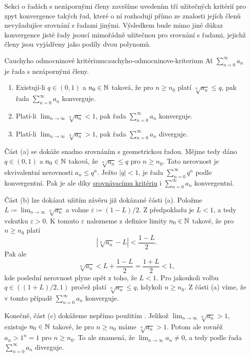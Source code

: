 Sekci o řadách s nezápornými členy završíme uvedením tří užitečných kritérií pro
zpyt konvergence takých řad, které o ní rozhodují přímo ze znalosti jejích
členů nevyžadujíce srovnání s řadami jinými. Výsledkem bude mimo jiné důkaz
konvergence jisté řady jsoucí mimořádně užitečnou pro srovnání s řadami, jejichž
členy jsou vyjádřeny jako podíly dvou polynomů.

\begin{theorem}{Cauchyho odmocninové kritérium}{cauchyho-odmocninove-kriterium}
 Ať $\sum_{n = 0}^{\infty} a_n$ je řada s nezápornými členy.
 \begin{enumerate}[label=(\alph*)]
  \item Existují-li $q \in (0,1)$ a $n_0 \in \mathbb{N}$ taková, že pro $n \geq n_0$
   platí $\sqrt[n]{a_n} \leq q$, pak řada $\sum_{n = 0}^{\infty} a_n$
   konverguje.
  \item Platí-li $\lim_{n \to \infty} \sqrt[n]{a_n} < 1$, pak řada $\sum_{n =
   0}^{\infty} a_n$ konverguje.
  \item Platí-li $\lim_{n \to \infty} \sqrt[n]{a_n} > 1$, pak řada $\sum_{n =
   0}^{\infty} a_n$ diverguje.
 \end{enumerate}
\end{theorem}

\begin{thmproof}
 Část (a) se dokáže snadno srovnáním s geometrickou řadou. Mějme tedy dáno $q
 \in (0,1)$ a $n_0 \in \mathbb{N}$ taková, že $\sqrt[n]{a_n} \leq q$ pro $n \geq n_0$.
 Tato nerovnost je ekvivalentní nerovnosti $a_n \leq q^{n}$. Ježto $|q|<1$, je
 řada $\sum_{n = 0}^{\infty} q^n$ podle 
 konvergentní. Pak je ale díky \hyperref[prop:srovnavaci-kriterium]{srovnávacímu
 kritériu} i $\sum_{n = 0}^{\infty} a_n$ konvergentní.

 Část (b) lze dokázat užitím závěru již dokázané části (a). Položme $L \coloneqq
 \lim_{n \to \infty} \sqrt[n]{a_n}$ a volme $\varepsilon \coloneqq (1-L) / 2$. Z
 předpokladu je $L < 1$, a tedy vskutku $\varepsilon > 0$. K tomuto
 $\varepsilon$ nalezneme z definice limity $n_0 \in \mathbb{N}$ takové, že pro $n \geq
 n_0$ platí
 \[
  |\sqrt[n]{a_n} - L| < \frac{1-L}{2}.
 \]
 Pak ale
 \[
  \sqrt[n]{a_n} < L + \frac{1-L}{2} = \frac{1+L}{2} < 1,
 \]
 kde poslední nerovnost plyne opět z toho, že $L < 1$. Pro jakoukoli volbu $q
 \in ((1+L) / 2,1)$ pročež platí $\sqrt[n]{a_n} \leq q$, kdykoli $n \geq n_0$. Z
 části (a) víme, že v tomto případě $\sum_{n = 0}^{\infty} a_n$ konverguje.

 Konečně, část (c) dokážeme nepřímo použitím
 . Jelikož $\lim_{n \to
 \infty} \sqrt[n]{a_n} > 1$, existuje $n_0 \in \mathbb{N}$ takové, že pro $n \geq n_0$
 máme $\sqrt[n]{a_n} > 1$. Potom ale rovněž $a_n > 1^{n} = 1$ pro $n \geq n_0$.
 To ale znamená, že $\lim_{n \to \infty} a_n \neq 0$, a tedy podle
  řada $\sum_{n =
 0}^{\infty} a_n$ diverguje.
\end{thmproof}

